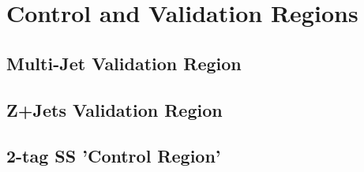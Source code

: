 \chapter{Control and Validation Regions}


\section{Multi-Jet Validation Region}

\section{Z+Jets Validation Region}

\section{2-tag SS 'Control Region'}

